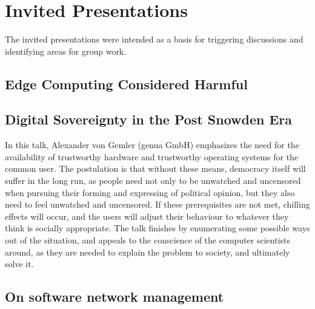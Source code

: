 \section{Invited Presentations}\label{sec:invited-presentations}

The invited presentations were intended as a basis for triggering discussions
and identifying areas for group work.

\subsection{Edge Computing Considered Harmful}


\subsection{Digital Sovereignty in the Post Snowden Era}

In this talk, Alexander von Gemler (genua GmbH) emphasizes the need for the
availability of trustworthy hardware and trustworthy operating systems for the
common user.  The postulation is that without these means, democracy itself
will suffer in the long run, as people need not only to be unwatched and
uncensored when pursuing their forming and expressing of political opinion,
but they also need to feel unwatched and uncensored.  If these prerequisites
are not met, chilling effects will occur, and the users will adjust their
behaviour to whatever they think is socially appropriate.  The talk finishes
by enumerating some possible ways out of the situation, and appeals to the
conscience of the computer scientists around, as they are needed to explain
the problem to society, and ultimately solve it.


\subsection{On software network management}

